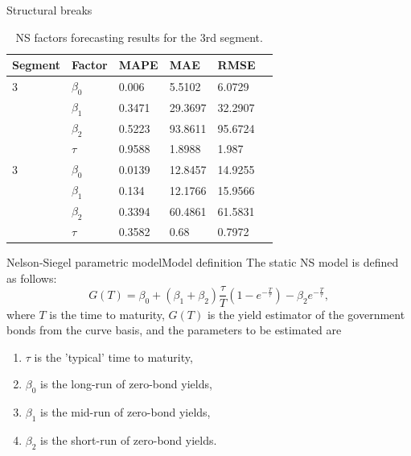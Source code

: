 \documentclass[aspectratio=169]{beamer}
\begin{document}
    \begin{frame}{Structural breaks}
        \begin{table}[htbp]
            \centering
            \begin{tabular}{|l|l|l|l|l|l|}
            \hline
            Segment            & Factor    & MAPE         & MAE         & RMSE    \\ \hline
            \multirow{ARIMA}{*}{3} & $\beta_0$ & 0.006        & 5.5102      & 6.0729  \\ \cline{2-7} 
                               & $\beta_1$ & 0.3471       & 29.3697     & 32.2907 \\ \cline{2-7} 
                               & $\beta_2$ & 0.5223       & 93.8611     & 95.6724 \\ \cline{2-7} 
                               & $\tau$    & 0.9588       & 1.8988      & 1.987   \\ \hline
            \multirow{VAR}{*}{3} & $\beta_0$ & 0.0139       & 12.8457     & 14.9255     \\ \cline{2-7} 
                               & $\beta_1$ & 0.134        &  12.1766    &  15.9566    \\ \cline{2-7} 
                               & $\beta_2$ &  0.3394      & 60.4861     &  61.5831    \\ \cline{2-7} 
                               & $\tau$    &  0.3582      &  0.68       &  0.7972    \\ \hline
            \end{tabular}
            \caption{NS factors forecasting results for the 3rd segment.}
        \end{table}
    \end{frame}

    \begin{frame}{Nelson-Siegel parametric model}{Model definition}
        The static NS model is defined as follows:
            \begin{equation}\label{eq:NS}
                G(T) = \beta_0 + (\beta_1+\beta_2)\frac{\tau}{T}\left(1-e^{-\frac{T}{\tau}}\right)-\beta_2  e^{-\frac{T}{\tau}},
            \end{equation}
            where $T$ is the time to maturity, $G(T)$ is the yield estimator of the government bonds from the curve basis, 
            and the parameters to be estimated are
            \begin{enumerate}
                \item $\tau$ is the 'typical' time to maturity, 
                \item $\beta_0$ is the long-run of zero-bond yields, 
                \item $\beta_1$ is the mid-run of zero-bond yields, 
                \item $\beta_2$ is the short-run of zero-bond yields.
            \end{enumerate}
    \end{frame}
\end{document}
